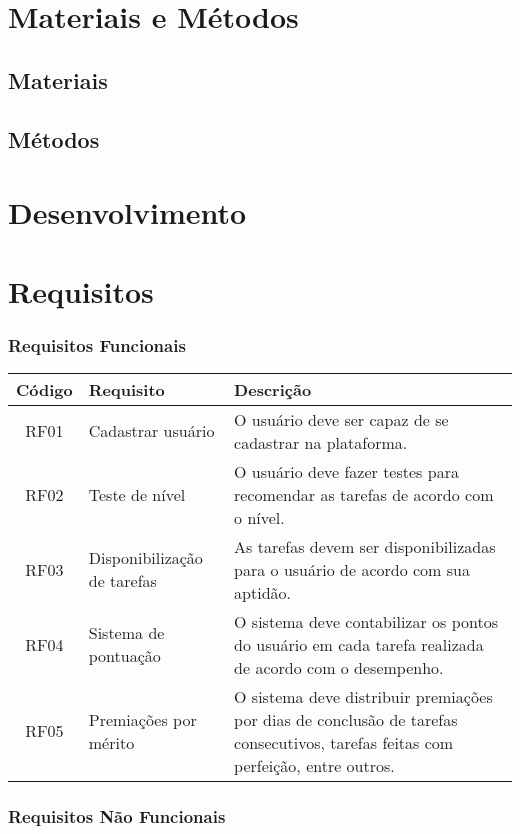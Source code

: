\documentclass[
	article,			%
	12pt,				%
	oneside,			%
	a4paper,			%
	english,			%
	brazil,				%
	sumario=tradicional
	]{abntex2}
\begin{document}
\section{Materiais e Métodos}

\subsection{Materiais}

\subsection{Métodos}

\section{Desenvolvimento}

\section{Requisitos}
\subsubsection{Requisitos Funcionais}
\begin{tabular}{|c|l|p{6cm}|}
\hline
\textbf{Código} & \textbf{Requisito} & \textbf{Descrição} \\
\hline
RF01 & Cadastrar usuário & O usuário deve ser capaz de se cadastrar na plataforma.\\
\hline
RF02 & Teste de nível & O usuário deve fazer testes para recomendar as tarefas de acordo com o nível.\\
\hline
RF03 & Disponibilização de tarefas & As tarefas devem ser disponibilizadas para o usuário de acordo com sua aptidão. \\
\hline
RF04 & Sistema de pontuação & O sistema deve contabilizar os pontos do usuário em cada tarefa realizada de acordo com o desempenho. \\
\hline
RF05 & Premiações por mérito & O sistema deve distribuir premiações por dias de conclusão de tarefas consecutivos, tarefas feitas com perfeição, entre outros. \\
\hline
\end{tabular}
\subsubsection{Requisitos Não Funcionais}
\end{document}
